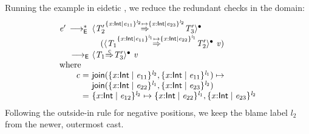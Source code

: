 \documentclass[9pt]{extarticle}
\newcommand{\ottnt}[1]{\mathit{#1}}
\begin{document}
Running the example in eidetic \lambdah, we reduce the redundant
checks in the domain:
\[ \begin{array}{r@{~}l}
  \ottnt{e'} \,  \longrightarrow ^{*}_{  \mathsf{E}  }  \,    &  \langle  \ottnt{T'_{{\mathrm{2}}}}  \mathord{ \overset{  \{ \mathit{x} \mathord{:}  \mathsf{Int}  \mathrel{\mid} \ottnt{e_{{\mathrm{11}}}} \}^{ \ottnt{l_{{\mathrm{2}}}} }   \mapsto   \{ \mathit{x} \mathord{:}  \mathsf{Int}  \mathrel{\mid} \ottnt{e_{{\mathrm{23}}}} \}^{ \ottnt{l_{{\mathrm{2}}}} }  }{\Rightarrow} }  \ottnt{T'_{{\mathrm{3}}}}  \rangle^{\bullet} ~  {} \\  &  \quad   (  \langle  \ottnt{T_{{\mathrm{1}}}}  \mathord{ \overset{  \{ \mathit{x} \mathord{:}  \mathsf{Int}  \mathrel{\mid} \ottnt{e_{{\mathrm{11}}}} \}^{ \ottnt{l_{{\mathrm{1}}}} }   \mapsto   \{ \mathit{x} \mathord{:}  \mathsf{Int}  \mathrel{\mid} \ottnt{e_{{\mathrm{22}}}} \}^{ \ottnt{l_{{\mathrm{1}}}} }  }{\Rightarrow} }  \ottnt{T'_{{\mathrm{2}}}}  \rangle^{\bullet} ~  \mathit{v}  )   \\
   \longrightarrow _{  \mathsf{E}  }  &  \langle  \ottnt{T_{{\mathrm{1}}}}  \mathord{ \overset{ \ottnt{c} }{\Rightarrow} }  \ottnt{T'_{{\mathrm{3}}}}  \rangle^{\bullet} ~  \mathit{v}  \\
  \multicolumn{2}{l}{\text{where }} \\
  \ottnt{c} = &  \mathsf{join} (  \{ \mathit{x} \mathord{:}  \mathsf{Int}  \mathrel{\mid} \ottnt{e_{{\mathrm{11}}}} \}^{ \ottnt{l_{{\mathrm{2}}}} }  ,  \{ \mathit{x} \mathord{:}  \mathsf{Int}  \mathrel{\mid} \ottnt{e_{{\mathrm{11}}}} \}^{ \ottnt{l_{{\mathrm{1}}}} }  )   \mapsto  {} \\  &   \mathsf{join} (  \{ \mathit{x} \mathord{:}  \mathsf{Int}  \mathrel{\mid} \ottnt{e_{{\mathrm{22}}}} \}^{ \ottnt{l_{{\mathrm{1}}}} }  ,  \{ \mathit{x} \mathord{:}  \mathsf{Int}  \mathrel{\mid} \ottnt{e_{{\mathrm{23}}}} \}^{ \ottnt{l_{{\mathrm{2}}}} }  )  \\
        = &  \{ \mathit{x} \mathord{:}  \mathsf{Int}  \mathrel{\mid} \ottnt{e_{{\mathrm{12}}}} \}^{ \ottnt{l_{{\mathrm{2}}}} }   \mapsto    \{ \mathit{x} \mathord{:}  \mathsf{Int}  \mathrel{\mid} \ottnt{e_{{\mathrm{22}}}} \}^{ \ottnt{l_{{\mathrm{1}}}} }  ,  \{ \mathit{x} \mathord{:}  \mathsf{Int}  \mathrel{\mid} \ottnt{e_{{\mathrm{23}}}} \}^{ \ottnt{l_{{\mathrm{2}}}} }  
\end{array} \]
Following the outside-in rule for negative positions, we keep the
blame label $\ottnt{l_{{\mathrm{2}}}}$ from the newer, outermost cast.
\end{document}
